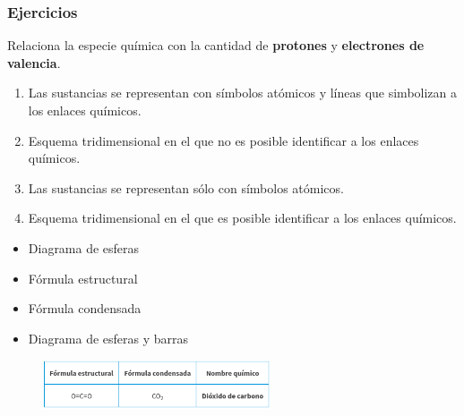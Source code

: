\documentclass[11pt]{book}
\begin{document}
\subsubsection{Ejercicios}
\begin{boxK}
  Relaciona la especie química con la cantidad de \textbf{protones} y \textbf{electrones de valencia}.\\

  \begin{minipage}{0.6\textwidth}
    \begin{enumerate}
      \item Las sustancias se representan con símbolos atómicos y líneas que simbolizan a los enlaces químicos.
      \item Esquema tridimensional en el que no es posible identificar a los enlaces químicos.
      \item Las sustancias se representan sólo con símbolos atómicos.
      \item Esquema tridimensional en el que es posible identificar a los enlaces químicos.
    \end{enumerate}
  \end{minipage}\hfill
  \begin{minipage}{0.3\textwidth}
    \begin{itemize}
      \item[\rule{1cm}{0.2mm}] Diagrama de esferas\\
      \item[\rule{1cm}{0.2mm}] Fórmula estructural\\
      \item[\rule{1cm}{0.2mm}] Fórmula condensada\\
      \item[\rule{1cm}{0.2mm}] Diagrama de esferas y barras\\
    \end{itemize}
  \end{minipage}

\end{boxK}


\begin{figure}[H]
  \centering
  \includegraphics[width=0.6\textwidth]{formulas_co2.png}
  \label{fig:formulas_co2}
\end{figure}
\end{document}
